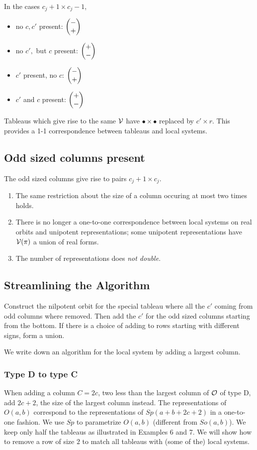\documentclass[11pt ,reqno]{amsart}
\begin{document}
In the cases $c_{j}+1\times c_{j}-1$,
\begin{itemize}
\item no $c,c'$ present: $\left(\begin{matrix}-\\+\end{matrix}\right)$
\item no $c',$ but $c$ present: $\left(\begin{matrix} +\\-\end{matrix}\right)$
\item $c'$ present, no $c$:   $\left(\begin{matrix}-\\ +\end{matrix}\right)$ 
\item $c'$ and $c$ present: $\left(\begin{matrix} +\\-\end{matrix}\right)$  
\end{itemize}
{Tableaus which give rise to the same ${\mathcal V}$ have
  $\bullet\times\bullet$ replaced by $c'\times r.$}
This provides a 1-1 correspondence between tableaus and local systems.

\newpage


\subsection{Odd sized columns present}
The odd sized columns give rise to pairs $c_j+1\times c_j.$
\begin{enumerate}
\item The same restriction about the size of a column occuring at most
  two times holds.  
\item There is no longer a one-to-one correspondence between local
  systems on real orbits and unipotent representations; some unipotent
  representations have ${\mathcal V}(\pi)$ a union of real forms.
\item The number of representations does \textit{not double}.
\end{enumerate}
\subsection{Streamlining the Algorithm} Construct the nilpotent orbit
for the special tableau where all the $c'$ coming from odd columns where removed. Then add the $c'$ for the odd sized columns starting from the bottom. If there is a choice of adding to rows starting with different signs, form a union.

\bigskip
We write down an algorithm for the local system by
adding a largest  column.
\subsubsection{Type D to type C} When adding a column
$C=2c$, two less than the largest column of $\mathcal O$ of type D, add
$2c+2$, the size of the largest column instead. 
The representations of $O(a,b)$ correspond to the representations of
\newline $Sp(a+b+2c+2)$ in a one-to-one fashion.
We use $Sp$ to parametrize $O(a,b)$ (different
from $So(a,b)$). We keep only half the tableaus as illustrated in Examples 6 and 7. 
We will  show how to remove a row of size $2$ to match all tableaus
with (some of the) local systems.
\end{document}
